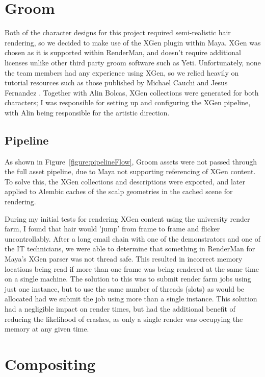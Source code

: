 \documentclass[11pt]{article}
\begin{document}
\section{Groom}

Both of the character designs for this project required semi-realistic hair rendering, so we decided to make use of the XGen plugin within Maya. XGen was chosen as it is supported within RenderMan, and doesn't require additional licenses unlike other third party groom software such as Yeti. Unfortunately, none the team members had any experience using XGen, so we relied heavily on tutorial resources such as those published by Michael Cauchi \cite{cauchi_2017} and Jesus Fernandez \cite{fernandez_2018}. Together with Alin Bolcas, XGen collections were generated for both characters; I was responsible for setting up and configuring the XGen pipeline, with Alin being responsible for the artistic direction.

\subsection{Pipeline} \label{threadsafe}

As shown in Figure~\ref{figure:pipelineFlow}, Groom assets were not passed through the full asset pipeline, due to Maya not supporting referencing of XGen content. To solve this, the XGen collections and descriptions were exported, and later applied to Alembic caches of the scalp geometries in the cached scene for rendering.

During my initial tests for rendering XGen content using the university render farm, I found that hair would 'jump' from frame to frame and flicker uncontrollably. After a long email chain with one of the demonstrators and one of the IT technicians, we were able to determine that something in RenderMan for Maya's XGen parser was not thread safe. This resulted in incorrect memory locations being read if more than one frame was being rendered at the same time on a single machine. The solution to this was to submit render farm jobs using just one instance, but to use the same number of threads (slots) as would be allocated had we submit the job using more than a single instance. This solution had a negligible impact on render times, but had the additional benefit of reducing the likelihood of crashes, as only a single render was occupying the memory at any given time.

\section{Compositing}
\end{document}

